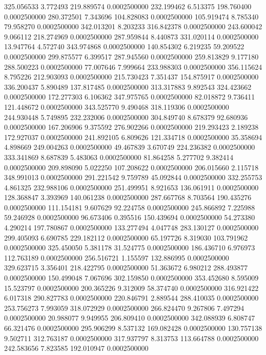 325.056533 3.772493 219.889574 0.0002500000
232.199462 6.513375 198.760400 0.0002500000
280.372501 7.343696 104.828083 0.0002500000
105.919474 8.785340 79.958270 0.0002500000
342.013201 8.203233 316.842378 0.0002500000
243.600042 9.066112 218.274969 0.0002500000
287.959844 8.440873 331.020114 0.0002500000
13.947764 4.572740 343.974868 0.0002500000
140.854302 6.219235 59.209522 0.0002500000
299.875577 6.399517 287.945560 0.0002500000
259.813829 9.177180 288.500223 0.0002500000
77.007646 7.999664 233.988303 0.0002500000
356.115624 8.795226 212.903093 0.0002500000
215.730423 7.351437 154.875917 0.0002500000
336.200437 5.890489 137.817485 0.0002500000
313.317883 9.892543 324.423662 0.0002500000
172.277303 6.106362 347.975765 0.0002500000
82.018872 9.736411 121.448672 0.0002500000
343.525770 9.490468 318.119306 0.0002500000
244.930448 5.749895 232.232006 0.0002500000
304.849740 8.678379 92.680936 0.0002500000
167.206906 9.375592 276.902266 0.0002500000
219.293423 2.189238 172.927037 0.0002500000
241.892105 6.809626 121.334718 0.0002500000
35.358694 4.898669 249.004263 0.0002500000
49.467839 3.670749 224.236382 0.0002500000
333.341869 8.687839 5.483063 0.0002500000
81.864258 5.277702 9.382414 0.0002500000
209.898090 5.022250 107.208622 0.0002500000
206.015660 2.115718 348.991013 0.0002500000
291.221542 9.759789 45.092844 0.0002500000
332.255753 4.861325 232.988106 0.0002500000
251.499951 8.921653 136.061911 0.0002500000
128.368847 3.393969 140.061238 0.0002500000
287.667768 8.703564 190.435276 0.0002500000
111.154181 9.607629 92.224758 0.0002500000
245.866892 7.225988 59.246928 0.0002500000
96.673406 0.395516 150.439694 0.0002500000
54.273380 4.290214 197.780867 0.0002500000
133.277494 4.047748 283.130127 0.0002500000
299.405093 6.690785 229.182112 0.0002500000
65.197726 8.319030 103.791962 0.0002500000
325.450050 5.381178 31.524775 0.0002500000
186.436710 6.976973 112.763189 0.0002500000
256.516721 1.155597 132.886995 0.0002500000
329.623715 3.356401 218.422795 0.0002500000
51.363672 6.980212 288.493877 0.0002500000
150.499048 7.067696 302.159850 0.0002500000
353.452680 8.595009 15.523797 0.0002500000
200.365226 9.312009 58.374740 0.0002500000
316.921422 6.017318 290.827783 0.0002500000
220.846791 2.889544 288.410035 0.0002500000
253.756273 7.993059 318.072929 0.0002500000
266.824470 9.267806 7.497294 0.0002500000
20.988077 9.949955 206.809410 0.0002500000
342.088939 6.808747 66.321476 0.0002500000
295.906299 8.537132 169.082428 0.0002500000
130.757138 9.502711 312.763187 0.0002500000
317.937797 8.313753 113.664788 0.0002500000
242.583656 7.823585 192.010947 0.0002500000

